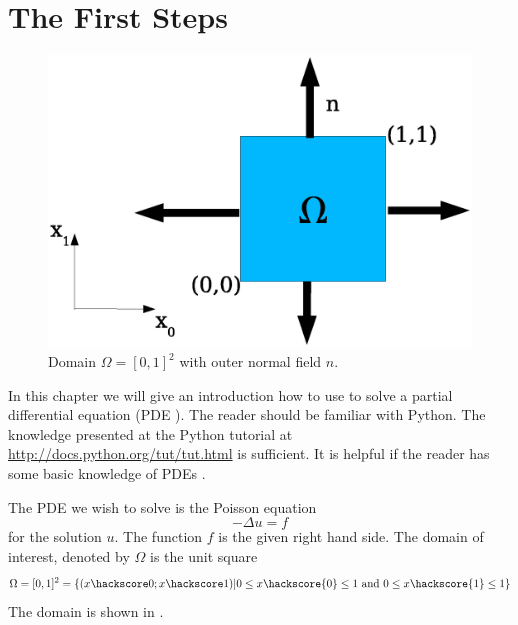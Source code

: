 
\chapter{The First Steps}
\label{FirstSteps} 

\begin{figure}
\centerline{\includegraphics[width=\figwidth]{FirstStepDomain}}
\caption{Domain $\Omega=[0,1]^2$ with outer normal field $n$.}
\label{fig:FirstSteps.1}
\end{figure}

In this chapter we will give an introduction how to use \escript to solve 
a partial differential equation  (PDE ). The reader should be familiar with Python. The knowledge presented at the Python tutorial at \url{http://docs.python.org/tut/tut.html}
is sufficient. It is helpful if the reader has some basic knowledge of PDEs .

The PDE  we wish to solve is the Poisson equation  
\begin{equation}
-\Delta u =f 
\label{eq:FirstSteps.1}
\end{equation}
for the solution $u$. The function $f$ is the given right hand side. The domain of interest, denoted by $\Omega$
is the unit square 
\begin{equation}
\Omega=[0,1]^2=\{ (x\hackscore 0;x\hackscore 1) | 0\le x\hackscore{0} \le 1 \mbox{ and } 0\le x\hackscore{1} \le 1 \}
\label{eq:FirstSteps.1b}
\end{equation}
The domain is shown in .

